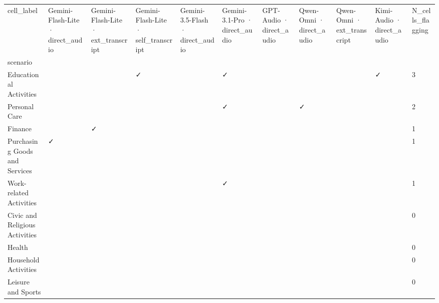 \begin{tabular}{lllllllllll}
\toprule
cell_label & Gemini-Flash-Lite · direct\_audio & Gemini-Flash-Lite · ext\_transcript & Gemini-Flash-Lite · self\_transcript & Gemini-3.5-Flash · direct\_audio & Gemini-3.1-Pro · direct\_audio & GPT-Audio · direct\_audio & Qwen-Omni · direct\_audio & Qwen-Omni · ext\_transcript & Kimi-Audio · direct\_audio & N\_cells\_flagging \\
scenario &  &  &  &  &  &  &  &  &  &  \\
\midrule
Educational Activities &  &  & ✓ &  & ✓ &  &  &  & ✓ & 3 \\
Personal Care &  &  &  &  & ✓ &  & ✓ &  &  & 2 \\
Finance &  & ✓ &  &  &  &  &  &  &  & 1 \\
Purchasing Goods and Services & ✓ &  &  &  &  &  &  &  &  & 1 \\
Work-related Activities &  &  &  &  & ✓ &  &  &  &  & 1 \\
Civic and Religious Activities &  &  &  &  &  &  &  &  &  & 0 \\
Health &  &  &  &  &  &  &  &  &  & 0 \\
Household Activities &  &  &  &  &  &  &  &  &  & 0 \\
Leisure and Sports &  &  &  &  &  &  &  &  &  & 0 \\
\bottomrule
\end{tabular}

